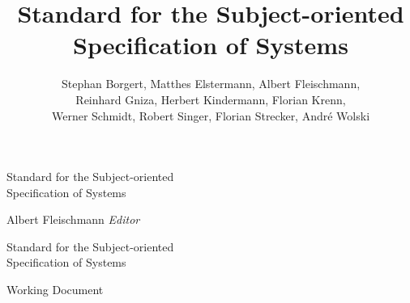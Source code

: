 \documentclass[11pt, showtrims, final]{memoir}
\title{Standard for the Subject-oriented\\ Specification of Systems}
\author{Stephan Borgert, Matthes Elstermann, Albert Fleischmann, \\ Reinhard Gniza, Herbert Kindermann, Florian Krenn,\\ Werner Schmidt, Robert Singer, Florian Strecker, André Wolski}
\begin{document}
	




\frontmatter

\pagestyle{empty}

\vspace*{3cm}
\begin{adjustwidth}{0cm}{-3cm}
	\begin{flushright}
		\LARGE\textsf Standard for the Subject-oriented\\Specification of Systems
	\end{flushright}
\end{adjustwidth}
\vspace*{\fill}
\cleardoublepage

\vspace*{0cm}
\begin{flushleft}
	\Large\textsf{Albert Fleischmann \textit{Editor}}\par
\end{flushleft}
\vspace{2cm}
\begin{flushleft}
	\Huge\textsf{Standard for the Subject-oriented\\Specification of Systems}\par
	\bigskip\bigskip
	\Large\textsf{Working Document}
\end{flushleft}
\vspace{2.5cm}
\begin{flushleft}
\end{flushleft}
\vspace*{\fill}
\clearpage
\end{document}
